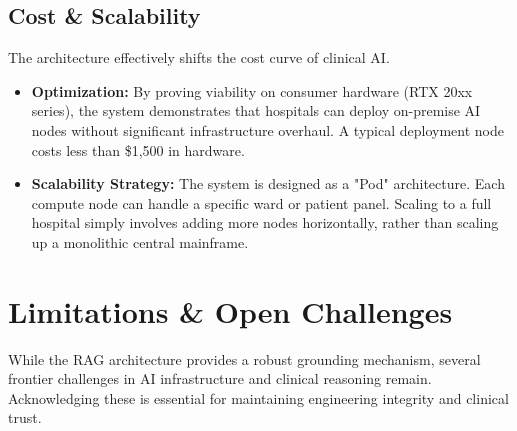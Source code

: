 \subsection{Cost \& Scalability}
The architecture effectively shifts the cost curve of clinical AI.

\begin{itemize}
    \item \textbf{Optimization:} By proving viability on consumer hardware (RTX 20xx series), the system demonstrates that hospitals can deploy on-premise AI nodes without significant infrastructure overhaul. A typical deployment node costs less than \$1,500 in hardware.

    \item \textbf{Scalability Strategy:} The system is designed as a "Pod" architecture. Each compute node can handle a specific ward or patient panel. Scaling to a full hospital simply involves adding more nodes horizontally, rather than scaling up a monolithic central mainframe.
\end{itemize}

\section{Limitations \& Open Challenges}
\label{sec:limitations}
While the RAG architecture provides a robust grounding mechanism, several frontier challenges in AI infrastructure and clinical reasoning remain. Acknowledging these is essential for maintaining engineering integrity and clinical trust.

